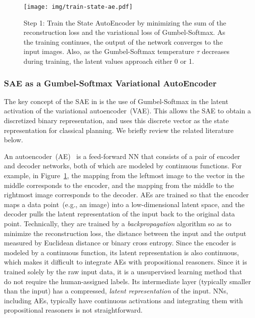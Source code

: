 \begin{figure}[tb]
 \texttt{[image: img/train-state-ae.pdf]}
 \caption{Step 1:
Train the State AutoEncoder by
 minimizing the sum of the reconstruction loss and the variational loss of Gumbel-Softmax.
As the training continues, the output of the network converges to the input images.
Also, as the Gumbel-Softmax temperature $\tau$ decreases during training,
the latent values approach either 0 or 1.}
 \label{sae}
\end{figure}

\subsubsection{SAE as a Gumbel-Softmax Variational AutoEncoder}

The key concept of the SAE in \latentplanner is the use of Gumbel-Softmax \cite{jang2016categorical}
in the latent activation of the variational autoencoder~(VAE).
This allows the SAE to obtain a discretized binary representation, and \latentplanner uses this
discrete vector as the state representation for classical planning.
We briefly review the related literature below.

An autoencoder~(AE)~\cite{hinton2006reducing} is a feed-forward NN that consists of a pair of encoder and decoder networks, both of which are modeled by continuous functions.
For example, in Figure~\ref{sae}, the mapping from the leftmost image to the vector in the middle corresponds to the encoder, and the mapping from the middle to the rightmost image corresponds to the decoder.
AEs are trained so that the encoder maps a data point~(e.g., an image) into a low-dimensional latent space, and the decoder pulls the latent representation of the input back to the original data point.
Technically, they are trained by a \emph{backpropagation} algorithm so as to minimize the reconstruction loss, the distance between the input and the output measured by Euclidean distance or binary cross entropy.
Since the encoder is modeled by a continuous function, its latent representation is also continuous, which makes it difficult to integrate AEs with propositional reasoners.
Since it is trained solely by the raw input data, it is a unsupervised learning method that do not require the human-assigned labels.
Its intermediate layer (typically smaller than the input) has a compressed, \emph{latent representation} of the input.
NNs, including AEs, typically have continuous activations and integrating them with propositional reasoners is not straightforward.
\fi

